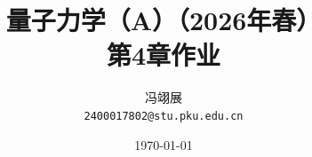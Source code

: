 \title{\textbf{量子力学（A）（2026年春）} \\[0.5em]
    \Large 第4章作业}
\author{冯翊展 \\ 
    \normalsize{\texttt{2400017802@stu.pku.edu.cn}}}
\date{\today}